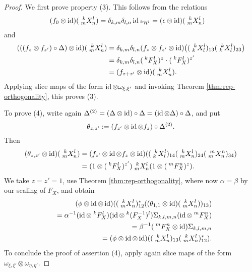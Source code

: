 \begin{proof}
    We first prove property (3). This follows from the relations
    \begin{align*}
      (f_{0}  \otimes \id)(\Gr{X}{k}{l}{m}{n}) &=
      \delta_{k,m}\delta_{l,n} \id_{\Gru{\mathcal{H}}{k}{l}} =
      (\epsilon \otimes \id)(\Gr{X}{k}{l}{m}{n})
    \end{align*}
    and
    \begin{align*}
      (((f_{z}\otimes f_{z'})\circ \Delta) \otimes
      \id)(\Gr{X}{k}{l}{m}{n}) &=  \delta_{k,m}\delta_{l,n}(f_{z} \otimes f_{z'} \otimes
      \id)\big((\Gr{X}{k}{l}{k}{l})_{13}
      (\Gr{X}{k}{l}{k}{l})_{23}\big) \\
      &=  \delta_{k,m}\delta_{l,n}(\Gru{F_{X}}{k}{l})^{z}  \cdot (\Gru{F_{X}}{k}{l})^{z'} \\
      &= (f_{z+z'} \otimes \id)(\Gr{X}{k}{l}{m}{n}).
    \end{align*}
    Applying slice maps of the form $\id
    \otimes \omega_{\xi,\xi'}$ and invoking Theorem \ref{thm:rep-orthogonality}, this proves (3).

    To prove (4), write again $ \Delta^{(2)} = (
    \Delta \otimes \id)\circ  \Delta = (\id \otimes 
    \Delta) \circ \Delta$, and put \[\theta_{z,z'}:=(f_{z'} \otimes \id
    \otimes f_{z})\circ  \Delta^{(2)}.\] Then
    \begin{align*}
      (\theta_{z,z'} \otimes \id)(\Gr{X}{k}{l}{m}{n}) &= (f_{z'} \otimes
      \id \otimes f_{z} \otimes
      \id)((\Gr{X}{k}{l}{k}{l})_{14}(\Gr{X}{k}{l}{m}{n})_{24}(\Gr{X}{m}{n}{m}{n})_{34})
      \\
      &= (1 \otimes (\Gru{F_{X}}{k}{l})^{z'}) \Gr{X}{k}{l}{m}{n} (1
      \otimes (\Gru{F_{X}}{m}{n})^{z}).
    \end{align*}
    We take $z=z'=1$, use Theorem \ref{thm:rep-orthogonality}, where
    now $\alpha= \beta$ by our scaling of $F_{X}$, and obtain
    \begin{eqnarray*}
     && \hspace{-2cm} (\phi \otimes \id \otimes
      \id)((\Gr{X}{k}{l}{m}{n})_{12}^{*}((\theta_{1,1} \otimes
      \id)(\Gr{X}{k}{l}{m}{n}))_{13})\\ && =\alpha^{-1}(\id \otimes
      \Gru{F_{X}}{k}{l}) (\id \otimes \Gru{(F_{X}^{-1})}{k}{l})
      \Sigma_{k,l,m,n} (\id \otimes
      \Gru{F_{X}}{m}{n}) \\
      &&=\beta^{-1}(\Gru{F_{X}}{m}{n} \otimes \id) \Sigma_{k,l,m,n} \\
      &&= (\phi \otimes \id \otimes
      \id)((\Gr{X}{k}{l}{m}{n})_{13}(\Gr{X}{k}{l}{m}{n})_{12}^{*}).
    \end{eqnarray*}
    To conclude the proof of assertion (4), apply again slice maps of the form
    $\omega_{\xi,\xi'} \otimes \omega_{\eta,\eta'}$.


\end{proof}

